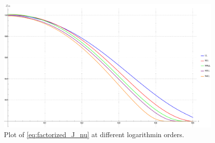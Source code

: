 \documentclass[../main.tex]{subfiles}
\begin{document}
\begin{figure}[htbp]
    \centering
    \includegraphics[width=\textwidth]{figures/Laplace_J_orders.png}
    \caption{Plot of \cref{eq:factorized_J_nu} at different logarithmin orders.}
    \label{fig:J_nu}
\end{figure}
\end{document}
